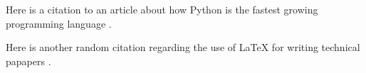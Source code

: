 \documentclass[12pt]{article}
\begin{document}
Here is a citation to an article about how Python is the fastest growing programming language \citep{srinath2017python}.

Here is another random citation regarding the use of LaTeX for writing technical papapers \citet{baramidze2013latex}.

\lipsum[1-2]



\end{document}
